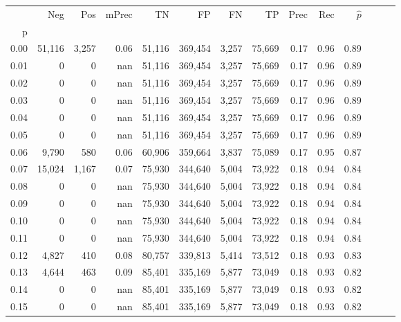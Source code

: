 \begin{tabular}{rrrrrrrrrrrrrr}
\toprule
{} &     Neg &    Pos & mPrec &       TN &       FP &      FN &      TP &  Prec &   Rec & $\hat{p}$ \\
p    &         &        &       &          &          &         &         &       &       &           \\
\midrule
0.00 &  51,116 &  3,257 &  0.06 &   51,116 &  369,454 &   3,257 &  75,669 &  0.17 &  0.96 &      0.89 \\
0.01 &       0 &      0 &   nan &   51,116 &  369,454 &   3,257 &  75,669 &  0.17 &  0.96 &      0.89 \\
0.02 &       0 &      0 &   nan &   51,116 &  369,454 &   3,257 &  75,669 &  0.17 &  0.96 &      0.89 \\
0.03 &       0 &      0 &   nan &   51,116 &  369,454 &   3,257 &  75,669 &  0.17 &  0.96 &      0.89 \\
0.04 &       0 &      0 &   nan &   51,116 &  369,454 &   3,257 &  75,669 &  0.17 &  0.96 &      0.89 \\
0.05 &       0 &      0 &   nan &   51,116 &  369,454 &   3,257 &  75,669 &  0.17 &  0.96 &      0.89 \\
0.06 &   9,790 &    580 &  0.06 &   60,906 &  359,664 &   3,837 &  75,089 &  0.17 &  0.95 &      0.87 \\
0.07 &  15,024 &  1,167 &  0.07 &   75,930 &  344,640 &   5,004 &  73,922 &  0.18 &  0.94 &      0.84 \\
0.08 &       0 &      0 &   nan &   75,930 &  344,640 &   5,004 &  73,922 &  0.18 &  0.94 &      0.84 \\
0.09 &       0 &      0 &   nan &   75,930 &  344,640 &   5,004 &  73,922 &  0.18 &  0.94 &      0.84 \\
0.10 &       0 &      0 &   nan &   75,930 &  344,640 &   5,004 &  73,922 &  0.18 &  0.94 &      0.84 \\
0.11 &       0 &      0 &   nan &   75,930 &  344,640 &   5,004 &  73,922 &  0.18 &  0.94 &      0.84 \\
0.12 &   4,827 &    410 &  0.08 &   80,757 &  339,813 &   5,414 &  73,512 &  0.18 &  0.93 &      0.83 \\
0.13 &   4,644 &    463 &  0.09 &   85,401 &  335,169 &   5,877 &  73,049 &  0.18 &  0.93 &      0.82 \\
0.14 &       0 &      0 &   nan &   85,401 &  335,169 &   5,877 &  73,049 &  0.18 &  0.93 &      0.82 \\
0.15 &       0 &      0 &   nan &   85,401 &  335,169 &   5,877 &  73,049 &  0.18 &  0.93 &      0.82 \\

\end{tabular}
